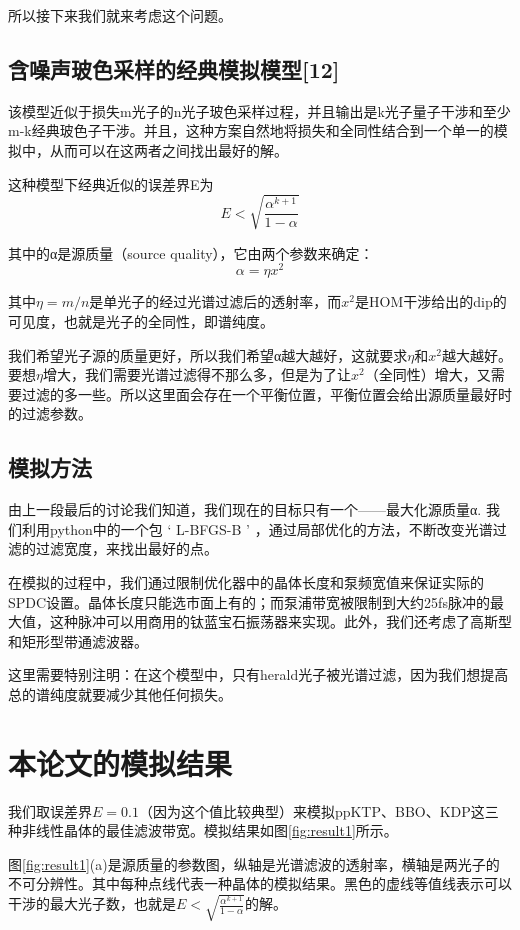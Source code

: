 所以接下来我们就来考虑这个问题。

\subsection{含噪声玻色采样的经典模拟模型[12]}

该模型近似于损失m光子的n光子玻色采样过程，并且输出是k光子量子干涉和至少m-k经典玻色子干涉。并且，这种方案自然地将损失和全同性结合到一个单一的模拟中，从而可以在这两者之间找出最好的解。

这种模型下经典近似的误差界E为
\[E<\sqrt{\frac{\alpha^{k+1}}{1-\alpha}}\]

其中的α是源质量（source quality），它由两个参数来确定：
\[\alpha=\eta x^2\]

其中$\eta=m/n$是单光子的经过光谱过滤后的透射率，而$x^2$是HOM干涉给出的dip的可见度，也就是光子的全同性，即谱纯度。

我们希望光子源的质量更好，所以我们希望α越大越好，这就要求$\eta$和$x^2$越大越好。要想$η$增大，我们需要光谱过滤得不那么多，但是为了让$x^2$（全同性）增大，又需要过滤的多一些。所以这里面会存在一个平衡位置，平衡位置会给出源质量最好时的过滤参数。


\subsection{模拟方法}

由上一段最后的讨论我们知道，我们现在的目标只有一个——最大化源质量α. 我们利用python中的一个包 ‘ L-BFGS-B ’ ，通过局部优化的方法，不断改变光谱过滤的过滤宽度，来找出最好的点。

在模拟的过程中，我们通过限制优化器中的晶体长度和泵频宽值来保证实际的SPDC设置。晶体长度只能选市面上有的；而泵浦带宽被限制到大约25fs脉冲的最大值，这种脉冲可以用商用的钛蓝宝石振荡器来实现。此外，我们还考虑了高斯型和矩形型带通滤波器。

这里需要特别注明：在这个模型中，只有herald光子被光谱过滤，因为我们想提高总的谱纯度就要减少其他任何损失。


\section{本论文的模拟结果}
我们取误差界$E=0.1$（因为这个值比较典型）来模拟ppKTP、BBO、KDP这三种非线性晶体的最佳滤波带宽。模拟结果如图\ref{fig:result1}所示。

图\ref{fig:result1}(a)是源质量的参数图，纵轴是光谱滤波的透射率，横轴是两光子的不可分辨性。其中每种点线代表一种晶体的模拟结果。黑色的虚线等值线表示可以干涉的最大光子数，也就是$E<\sqrt{\frac{\alpha^{k+1}}{1-\alpha}}$的解。

